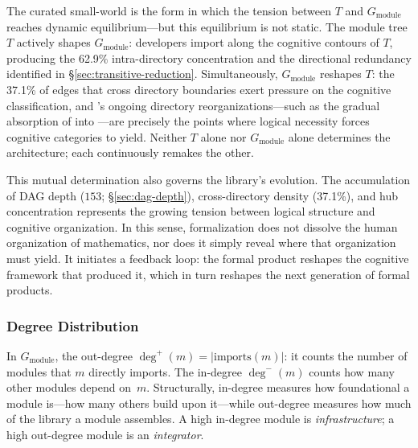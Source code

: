 The curated small-world is the form in which the tension between $T$ and $G_{\mathrm{module}}$ reaches dynamic equilibrium---but this equilibrium is not static. The module tree $T$ actively shapes $G_{\mathrm{module}}$: developers import along the cognitive contours of $T$, producing the 62.9\% intra-directory concentration and the directional redundancy identified in \S\ref{sec:transitive-reduction}. Simultaneously, $G_{\mathrm{module}}$ reshapes $T$: the 37.1\% of edges that cross directory boundaries exert pressure on the cognitive classification, and 's ongoing directory reorganizations---such as the gradual absorption of  into ---are precisely the points where logical necessity forces cognitive categories to yield. Neither $T$ alone nor $G_{\mathrm{module}}$ alone determines the architecture; each continuously remakes the other.

This mutual determination also governs the library's evolution. The accumulation of DAG depth ($153$; \S\ref{sec:dag-depth}), cross-directory density (37.1\%), and hub concentration represents the growing tension between logical structure and cognitive organization. In this sense, formalization does not dissolve the human organization of mathematics, nor does it simply reveal where that organization must yield. It initiates a feedback loop: the formal product reshapes the cognitive framework that produced it, which in turn reshapes the next generation of formal products.

\label{sec:structural-analysis}
\subsubsection{Degree Distribution}
\label{sec:degree-distribution}
\label{sec:sa-degree}

In $G_{\mathrm{module}}$, the out-degree $\deg^{+}(m) = |\mathrm{imports}(m)|$: it counts the number of modules that $m$ directly imports. The in-degree $\deg^{-}(m)$ counts how many other modules depend on~$m$.
Structurally, in-degree measures how foundational a module is---how many others build upon it---while out-degree measures how much of the library a module assembles. A high in-degree module is \emph{infrastructure}; a high out-degree module is an \emph{integrator}.

